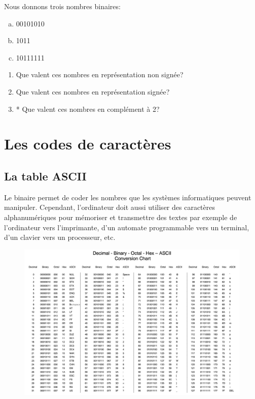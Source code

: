 \documentclass[11pt, a4paper]{book}
\begin{document}
\begin{exercice}
Nous donnons trois nombres binaires:
\begin{enumerate}[a)]
\item 00101010
\item 1011
\item 10111111
\end{enumerate}

\begin{enumerate}
\item Que valent ces nombres en représentation non signée?
\item Que valent ces nombres en représentation signée?
\item * Que valent ces nombres en complément à 2?
\end{enumerate}
\end{exercice}



\newpage
\section{Les codes de caractères}

\subsection{La table ASCII}
Le binaire permet de coder les nombres que les systèmes informatiques peuvent manipuler. Cependant, l'ordinateur doit aussi utiliser des caractères alphanumériques pour mémoriser et transmettre des textes par exemple de l’ordinateur vers l’imprimante, d’un automate programmable vers un terminal, d’un clavier vers un processeur, etc. 
\begin{center}
\begin{figure}[h!]
\centerline{\includegraphics[width=18cm]{images/ASCII2}}
\end{figure}
\end{center}
\end{document}
